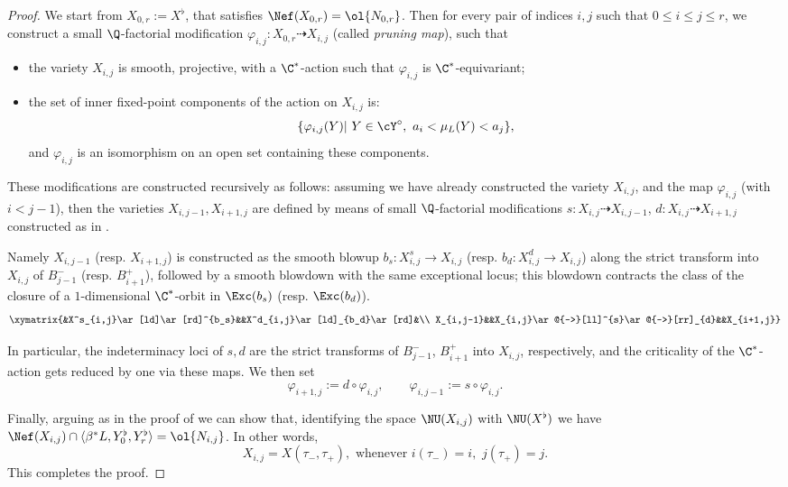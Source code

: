 \documentclass[reqno]{amsproc}
\theoremstyle{definition}
\def\prul{s}
\def\prur{d}
\begin{document}
\begin{proof}
We start from $X_{0,r}:=X^\flat$, that satisfies $\Nef(X_{0,r})=\ol{N_{0,r}}$. Then for every pair of indices $i,j$ such that $0 \le i \le j \le r$, we construct a small $\Q$-factorial modification $\varphi_{i,j}:X_{0,r}\dashrightarrow X_{i,j}$ (called {\em pruning map}), such that

\begin{itemize}[topsep=10pt]
\item the variety $X_{i,j}$ is smooth, projective, with a $\C^*$-action such that $\varphi_{i,j}$ is $\C^*$-equivariant;
\item the set of inner fixed-point components of the action on  $X_{i,j}$ is:  
$$
\{\varphi_{i,j}(Y)|\,\,Y\in\cY^\circ,\,\, a_i<\mu_L(Y)<a_j\},
$$
and $\varphi_{i,j}$ is an isomorphism on an open set containing these components.
\end{itemize}
These modifications are constructed recursively as follows: assuming we have already constructed the variety $X_{i,j}$, and the map $\varphi_{i,j}$ (with $i<j-1$), then the varieties $X_{i,j-1},X_{i+1,j}$ are defined by means of small $\Q$-factorial modifications $\prul: X_{i,j} \dashrightarrow X_{i,j-1}$, $\prur: X_{i,j} \dashrightarrow X_{i+1,j}$  constructed as in \cite[Theorem 3.1]{WORS3}.

Namely $X_{i,j-1}$ (resp. $X_{i+1,j}$) is constructed as the smooth blowup $b_\prul:X^\prul_{i,j} \to X_{i,j}$ (resp. $b_\prur:X^\prur_{i,j} \to X_{i,j}$) along the strict transform into $X_{i,j}$ of $B^-_{j-1}$ (resp. $B^+_{i+1}$), followed by a smooth blowdown with the same exceptional locus; this blowdown contracts the class of the closure of a $1$-dimensional $\C^*$-orbit in $\Exc(b_\prul)$ (resp. $\Exc(b_\prur)$). 
\begin{equation}\label{eq:blowups}\begin{gathered}
\xymatrix{&X^\prul_{i,j}\ar[ld]\ar[rd]^{b_\prul}&&X^\prur_{i,j}\ar[ld]_{b_\prur}\ar[rd]&\\
X_{i,j-1}&&X_{i,j}\ar@{-->}[ll]^{\prul}\ar@{-->}[rr]_{\prur}&&X_{i+1,j}}
\end{gathered}
\end{equation}

In particular, the indeterminacy loci of $\prul,\prur$ are the strict transforms of $B^-_{j-1}$, $B^+_{i+1}$ into $X_{i,j}$, respectively, and the criticality of the $\C^*$-action gets reduced by one via these maps.  
We then set $$\varphi_{i+1,j}:=\prur\circ\varphi_{i,j},\qquad\varphi_{i,j-1}:=\prul\circ\varphi_{i,j}.$$

Finally, arguing as in the proof of \cite[Proposition 4.11]{WORS3} we can show that, identifying the space $\NU(X_{i,j})$ with $\NU(X^\flat)$ we have $\Nef(X_{i,j})\cap \langle \beta^* L,Y^\flat_0,Y^\flat_r\rangle = \ol{N_{i,j}}$. In other words, 
$$
X_{i,j}=X(\tau_-,\tau_+), \mbox{ whenever } i(\tau_-)=i, \,\,j(\tau_+)=j.
$$
This completes the proof.
\end{proof}
\end{document}
